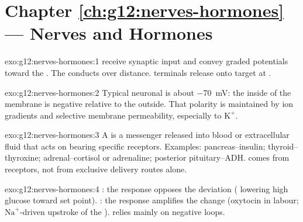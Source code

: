 \section*{Chapter \ref{ch:g12:nerves-hormones} --- Nerves and Hormones}

\begin{solution}{exo:g12:nerves-hormones:1}
 receive synaptic input and convey graded potentials toward the . The  conducts  over distance.  terminals release
 onto target  at .
\end{solution}

\begin{solution}{exo:g12:nerves-hormones:2}
Typical neuronal  is about \qty{-70}{mV}: the inside of the
membrane is negative relative to the outside. That polarity is maintained by
ion gradients and selective membrane permeability, especially to $\mathrm{K}^{+}$.
\end{solution}

\begin{solution}{exo:g12:nerves-hormones:3}
A  is a  messenger released into blood or extracellular fluid
that acts on  bearing specific receptors. Examples: pancreas--insulin;
thyroid--thyroxine; adrenal--cortisol or adrenaline; posterior
pituitary--ADH.  comes from receptors, not from exclusive delivery
routes alone.
\end{solution}

\begin{solution}{exo:g12:nerves-hormones:4}
: the response opposes the deviation ( lowering high
glucose toward set point). : the response amplifies the
change (oxytocin in labour; $\mathrm{Na}^{+}$-driven upstroke of the ).  relies mainly on negative loops.
\end{solution}


